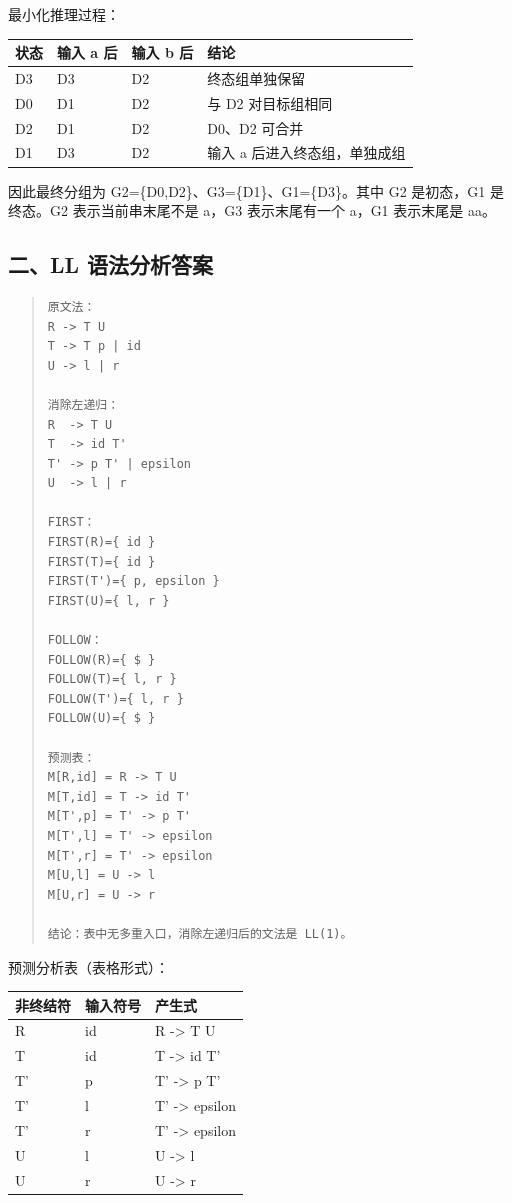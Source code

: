 \documentclass[UTF8,zihao=-4]{ctexart}
\begin{document}
最小化推理过程：

\begin{center}
\footnotesize
\begin{tabular}{llll}
\hline
状态 & 输入 a 后 & 输入 b 后 & 结论 \\
\hline
D3 & D3 & D2 & 终态组单独保留 \\
D0 & D1 & D2 & 与 D2 对目标组相同 \\
D2 & D1 & D2 & D0、D2 可合并 \\
D1 & D3 & D2 & 输入 a 后进入终态组，单独成组 \\
\hline
\end{tabular}
\end{center}

因此最终分组为 G2=\{D0,D2\}、G3=\{D1\}、G1=\{D3\}。其中 G2 是初态，G1 是终态。G2 表示当前串末尾不是 a，G3 表示末尾有一个 a，G1 表示末尾是 aa。



\subsection{二、LL 语法分析答案}


\begin{quote}
\footnotesize
\begin{verbatim}
原文法：
R -> T U
T -> T p | id
U -> l | r

消除左递归：
R  -> T U
T  -> id T'
T' -> p T' | epsilon
U  -> l | r

FIRST：
FIRST(R)={ id }
FIRST(T)={ id }
FIRST(T')={ p, epsilon }
FIRST(U)={ l, r }

FOLLOW：
FOLLOW(R)={ $ }
FOLLOW(T)={ l, r }
FOLLOW(T')={ l, r }
FOLLOW(U)={ $ }

预测表：
M[R,id] = R -> T U
M[T,id] = T -> id T'
M[T',p] = T' -> p T'
M[T',l] = T' -> epsilon
M[T',r] = T' -> epsilon
M[U,l] = U -> l
M[U,r] = U -> r

结论：表中无多重入口，消除左递归后的文法是 LL(1)。
\end{verbatim}
\end{quote}

预测分析表（表格形式）：

\begin{center}
\footnotesize
\begin{tabular}{lll}
\hline
非终结符 & 输入符号 & 产生式 \\
\hline
R & id & R -> T U \\
T & id & T -> id T' \\
T' & p & T' -> p T' \\
T' & l & T' -> epsilon \\
T' & r & T' -> epsilon \\
U & l & U -> l \\
U & r & U -> r \\
\hline
\end{tabular}
\end{center}
\end{document}
